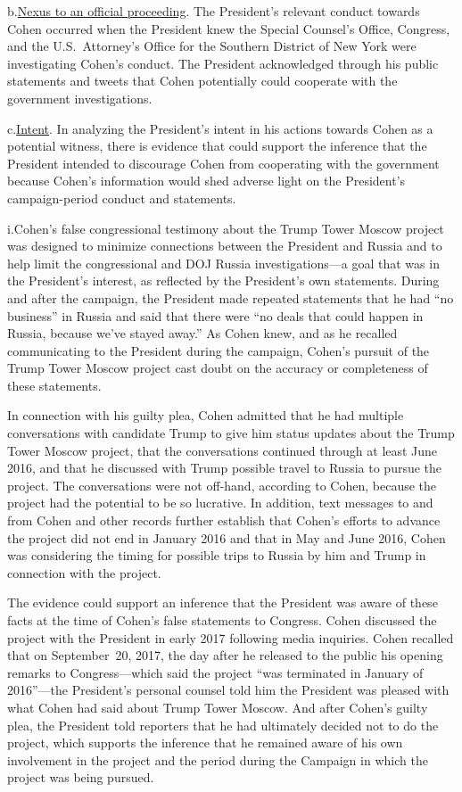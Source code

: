 b.\qquad\underline{Nexus to an official proceeding}.
The President's relevant conduct towards Cohen occurred when the President knew the Special Counsel's Office, Congress, and the U.S.~Attorney's Office for the Southern District of New York were investigating Cohen's conduct.
The President acknowledged through his public statements and tweets that Cohen potentially could cooperate with the government investigations.

c.\qquad\underline{Intent}.
In analyzing the President's intent in his actions towards Cohen as a potential witness, there is evidence that could support the inference that the President intended to discourage Cohen from cooperating with the government because Cohen's information would shed adverse light on the President's campaign-period conduct and statements.

\qquad i.\qquad Cohen's false congressional testimony about the Trump Tower Moscow project was designed to minimize connections between the President and Russia and to help limit the congressional and DOJ Russia investigations---a goal that was in the President's interest, as reflected by the President's own statements.
During and after the campaign, the President made repeated statements that he had ``no business'' in Russia and said that there were ``no deals that could happen in Russia, because we've stayed away.''
As Cohen knew, and as he recalled communicating to the President during the campaign, Cohen's pursuit of the Trump Tower Moscow project cast doubt on the accuracy or completeness of these statements.

In connection with his guilty plea, Cohen admitted that he had multiple conversations with candidate Trump to give him status updates about the Trump Tower Moscow project, that the conversations continued through at least June 2016, and that he discussed with Trump possible travel to Russia to pursue the project.
The conversations were not off-hand, according to Cohen, because the project had the potential to be so lucrative.
In addition, text messages to and from Cohen and other records further establish that Cohen's efforts to advance the project did not end in January 2016 and that in May and June 2016, Cohen was considering the timing for possible trips to Russia by him and Trump in connection with the project.

The evidence could support an inference that the President was aware of these facts at the time of Cohen's false statements to Congress.
Cohen discussed the project with the President in early 2017 following media inquiries.
Cohen recalled that on September~20, 2017, the day after he released to the public his opening remarks to Congress---which said the project ``was terminated in January of 2016''---the President's personal counsel told him the President was pleased with what Cohen had said about Trump Tower Moscow.
And after Cohen's guilty plea, the President told reporters that he had ultimately decided not to do the project, which supports the inference that he remained aware of his own involvement in the project and the period during the Campaign in which the project was being pursued.

